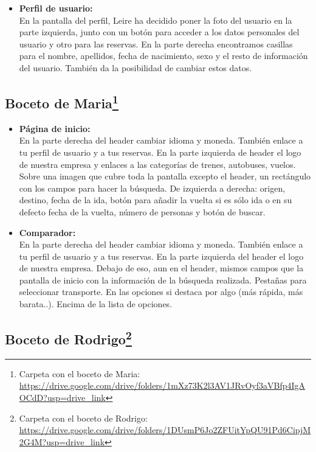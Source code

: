 \begin{itemize}
    \item\textbf{Perfil de usuario:} \\ En la pantalla del perfil, Leire ha decidido poner la foto del usuario en la parte izquierda, junto con un botón para acceder a los datos personales del usuario y otro para las reservas.
    En la parte derecha encontramos casillas para el nombre, apellidos, fecha de nacimiento, sexo y el resto de información del usuario. También da la posibilidad de cambiar estos datos.
    
\end{itemize}
\subsection[Boceto de Maria]{Boceto de Maria\footnote{Carpeta con el boceto de Maria: \url{https://drive.google.com/drive/folders/1mXz73K2l3AV1JRvOyf3aVBfp4IgAOCdD?usp=drive_link}}}

\begin{itemize}
    \item\textbf{Página de inicio:} \\ En la parte derecha del header cambiar idioma y moneda. También enlace a tu perfil de usuario y a tus reservas. 
    En la parte izquierda de header el logo de nuestra empresa y enlaces a las categorías de trenes, autobuses, vuelos.
    Sobre una imagen que cubre toda la pantalla excepto el header, un rectángulo con los campos para hacer la búsqueda. De izquierda a derecha: origen, destino, fecha de la ida, botón para añadir la vuelta si es sólo ida o en su defecto fecha de la vuelta, número de personas y botón de buscar. 
    
    \item\textbf{Comparador:} \\ En la parte derecha del header cambiar idioma y moneda. También enlace a tu perfil de usuario y a tus reservas. 
    En la parte izquierda del header el logo de nuestra empresa.
    Debajo de eso, aun en el header, mismos campos que la pantalla de inicio con la información de la búsqueda realizada.
    Pestañas para seleccionar transporte.
    En las opciones si destaca por algo (más rápida, más barata..).
    Encima de la lista de opciones.
    
\end{itemize}


\subsection[Boceto de Rodrigo]{Boceto de Rodrigo\footnote{Carpeta con el boceto de Rodrigo: \url{https://drive.google.com/drive/folders/1DUsmP6Jo2ZFUitYpQU91Pd6CipjM2G4M?usp=drive_link}}}

